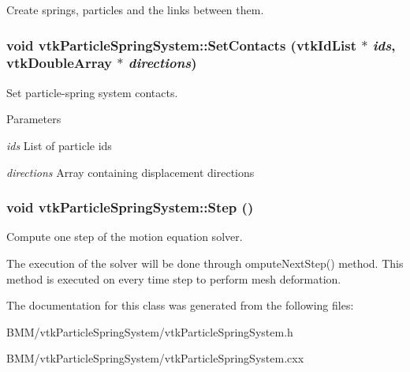 Create springs, particles and the links between them. \hypertarget{classvtkParticleSpringSystem_a83abe622cf6efc6018bacb06634b28ab}{
\subsubsection[{SetContacts}]{\setlength{\rightskip}{0pt plus 5cm}void vtkParticleSpringSystem::SetContacts (vtkIdList $\ast$ {\em ids}, \/  vtkDoubleArray $\ast$ {\em directions})}}
\label{classvtkParticleSpringSystem_a83abe622cf6efc6018bacb06634b28ab}


Set particle-\/spring system contacts. 


\begin{DoxyParams}{Parameters}
\item[{\em ids}]List of particle ids \item[{\em directions}]Array containing displacement directions \end{DoxyParams}
\hypertarget{classvtkParticleSpringSystem_ae8b588962013f85ed4810dceae94b698}{
\subsubsection[{Step}]{\setlength{\rightskip}{0pt plus 5cm}void vtkParticleSpringSystem::Step ()}}
\label{classvtkParticleSpringSystem_ae8b588962013f85ed4810dceae94b698}


Compute one step of the motion equation solver. 

The execution of the solver will be done through omputeNextStep() method. This method is executed on every time step to perform mesh deformation. 

The documentation for this class was generated from the following files:\begin{DoxyCompactItemize}
\item 
BMM/vtkParticleSpringSystem/vtkParticleSpringSystem.h\item 
BMM/vtkParticleSpringSystem/vtkParticleSpringSystem.cxx\end{DoxyCompactItemize}
